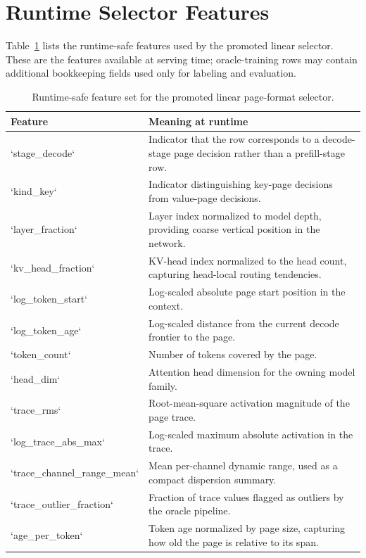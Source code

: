 \documentclass[11pt]{article}
\begin{document}
\clearpage
\appendix
\section{Runtime Selector Features}

Table~\ref{tab:runtime_selector_features} lists the runtime-safe features used by the promoted linear selector. These are the features available at serving time; oracle-training rows may contain additional bookkeeping fields used only for labeling and evaluation.

\begin{table}[H]
\centering
\small
\begin{tabularx}{\linewidth}{@{}lX@{}}
\toprule
Feature & Meaning at runtime \\
\midrule
`stage\_decode` & Indicator that the row corresponds to a decode-stage page decision rather than a prefill-stage row. \\
`kind\_key` & Indicator distinguishing key-page decisions from value-page decisions. \\
`layer\_fraction` & Layer index normalized to model depth, providing coarse vertical position in the network. \\
`kv\_head\_fraction` & KV-head index normalized to the head count, capturing head-local routing tendencies. \\
`log\_token\_start` & Log-scaled absolute page start position in the context. \\
`log\_token\_age` & Log-scaled distance from the current decode frontier to the page. \\
`token\_count` & Number of tokens covered by the page. \\
`head\_dim` & Attention head dimension for the owning model family. \\
`trace\_rms` & Root-mean-square activation magnitude of the page trace. \\
`log\_trace\_abs\_max` & Log-scaled maximum absolute activation in the trace. \\
`trace\_channel\_range\_mean` & Mean per-channel dynamic range, used as a compact dispersion summary. \\
`trace\_outlier\_fraction` & Fraction of trace values flagged as outliers by the oracle pipeline. \\
`age\_per\_token` & Token age normalized by page size, capturing how old the page is relative to its span. \\
\bottomrule
\end{tabularx}
\caption{Runtime-safe feature set for the promoted linear page-format selector.}
\label{tab:runtime_selector_features}
\end{table}

\FloatBarrier



\end{document}
